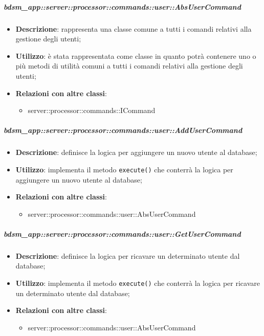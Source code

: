        \subparagraph{bdsm\_app::server::processor::commands::user::AbsUserCommand} %
        \label{subp:bdsm_app_server_processor_commands_user_absusercommand}
        \begin{itemize}
          \item \textbf{Descrizione}: rappresenta una classe comune a tutti i comandi relativi alla gestione degli utenti;
          \item \textbf{Utilizzo}: è stata rappresentata come classe in quanto potrà contenere uno o più metodi di utilità comuni a tutti i comandi relativi alla gestione degli utenti;
          \item \textbf{Relazioni con altre classi}:
            \begin{itemize}
              \item server::processor::commands::ICommand
            \end{itemize}
        \end{itemize}

        \subparagraph{bdsm\_app::server::processor::commands::user::AddUserCommand} %
        \label{subp:bdsm_app_server_processor_commands_user_addusercommand}
        \begin{itemize}
          \item \textbf{Descrizione}: definisce la logica per aggiungere un nuovo utente al database;
          \item \textbf{Utilizzo}: implementa il metodo \texttt{execute()} che conterrà la logica per aggiungere un nuovo utente al database;
          \item \textbf{Relazioni con altre classi}:
            \begin{itemize}
              \item server::processor::commands::user::AbsUserCommand
            \end{itemize}
        \end{itemize}

        \subparagraph{bdsm\_app::server::processor::commands::user::GetUserCommand} %
        \label{subp:bdsm_app_server_processor_commands_user_getusercommand}
        \begin{itemize}
          \item \textbf{Descrizione}: definisce la logica per ricavare un determinato utente dal database;
          \item \textbf{Utilizzo}: implementa il metodo \texttt{execute()} che conterrà la logica per ricavare un determinato utente dal database;
          \item \textbf{Relazioni con altre classi}:
            \begin{itemize}
              \item server::processor::commands::user::AbsUserCommand
            \end{itemize}
        \end{itemize}

